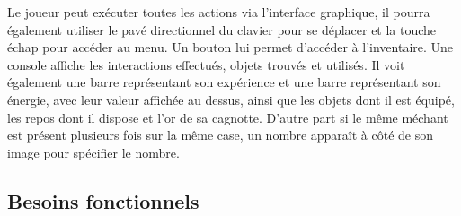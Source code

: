 \documentclass[11pt]{article}
\begin{document}
Le joueur peut exécuter toutes les actions via l'interface graphique, il pourra également utiliser le pavé directionnel du clavier pour se déplacer et la touche échap pour accéder au menu. Un bouton lui permet d’accéder à l'inventaire. Une console affiche les interactions effectués, objets trouvés et utilisés. Il voit également une barre représentant son expérience et une barre représentant son énergie, avec leur valeur affichée au dessus, ainsi que les objets dont il est équipé, les repos dont il dispose et l'or de sa cagnotte.
D'autre part si le même méchant est présent plusieurs fois sur la même case, un nombre apparaît à côté de son image pour spécifier le nombre.






\subsection{Besoins fonctionnels}

\vspace{0.5cm}
\end{document}
